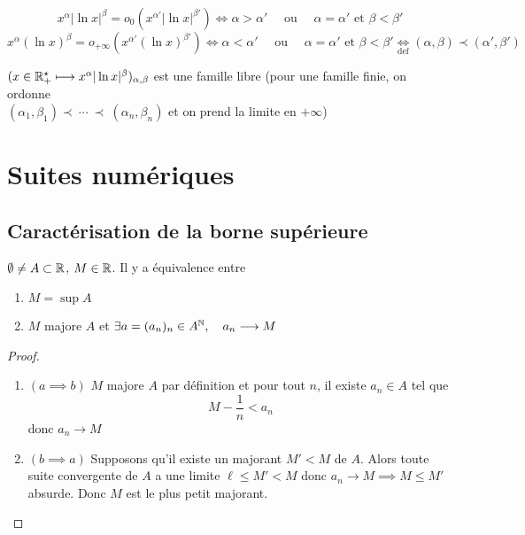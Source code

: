 \begin{ex}
    \[ x^\alpha|\ln x|^\beta=o_0(x^{\alpha'}|\ln x|^{\beta'})\iff \alpha>\alpha'\quad \text{ ou }\quad \alpha=\alpha'\text{ et }\beta<\beta'\]
    \[x^\alpha (\ln x)^\beta=o_{+\infty}(x^{\alpha'}(\ln x)^{\beta'})\iff \alpha<\alpha'\quad\text{ ou }\quad \alpha=\alpha'\text{ et }\beta<\beta'\underset{\text{def}}\iff (\alpha, \beta)\prec (\alpha', \beta')\]
\end{ex}

\begin{csq}
    $(x\in\mathbb R_+^\star\longmapsto x^\alpha |\ln x|^\beta)_{\alpha,\beta}$ est une famille libre (pour une famille finie, on ordonne \\$(\alpha_1, \beta_1)\prec~\cdots~\prec~(\alpha_n,\beta_n)$ et on prend la limite en $+\infty$)
\end{csq}

\section{Suites numériques}

\subsection{Caractérisation de la borne supérieure}

\begin{thm}
    \Hyp $\emptyset\neq A\subset\mathbb R$, $M\in\mathbb R$.
    \Conc Il y a équivalence entre \begin{enumerate}[label=(\alph{enumi}),left=1.2cm]
        \item $M=\sup A$
        \item $M$ majore $A$ et $\exists a=(a_n)_n\in A^{\mathbb N}, \quad a_n \longrightarrow M$
    \end{enumerate}
\end{thm}

\begin{proof}
    ~ \begin{enumerate}
        \item $(a\implies b)$ $M$ majore $A$ par définition et pour tout $n$, il existe $a_n\in A$ tel que \[
                M-\frac1n<a_n
            \]
            donc $a_n\longrightarrow M$
        \item $(b\implies a)$ Supposons qu'il existe un majorant $M'<M$ de $A$. Alors toute suite convergente de $A$ a une limite $\ell\leq M'<M$ donc $a_n\longrightarrow M\implies M\leq M'$ absurde. Donc $M$ est le plus petit majorant.
    \end{enumerate}
\end{proof}

